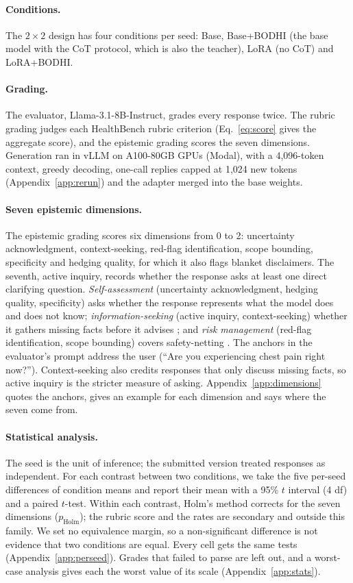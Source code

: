 \documentclass{article}
\newcommand{\bodhi}{BODHI}
\begin{document}
\paragraph{Conditions.} The $2 \times 2$ design has four conditions per seed: Base, Base+\bodhi{}
(the base model with the CoT protocol, which is also the teacher), LoRA (no CoT) and LoRA+\bodhi{}.

\paragraph{Grading.} The evaluator, Llama-3.1-8B-Instruct, grades every response twice. The rubric
grading judges each HealthBench rubric criterion (Eq.~\ref{eq:score} gives the aggregate score), and
the epistemic grading scores the seven dimensions. Generation ran in vLLM on A100-80GB GPUs
(Modal), with a 4,096-token context, greedy decoding, one-call replies capped at 1,024 new tokens
(Appendix~\ref{app:rerun}) and the adapter merged into the base weights.

\paragraph{Seven epistemic dimensions.} The epistemic grading scores six dimensions from 0 to 2:
uncertainty acknowledgment, context-seeking, red-flag identification, scope bounding, specificity
and hedging quality, for which it also flags blanket disclaimers. The seventh, active inquiry,
records whether the response asks at least one direct clarifying question. \emph{Self-assessment}
(uncertainty acknowledgment, hedging quality, specificity) asks whether the response represents
what the model does and does not know; \emph{information-seeking} (active inquiry,
context-seeking) whether it gathers missing facts before it advises \citep{simpkin2016tolerating};
and \emph{risk management} (red-flag identification, scope bounding) covers safety-netting
\citep{jones2019safety}. The anchors in the evaluator's prompt address the user (``Are you
experiencing chest pain right now?''). Context-seeking also credits responses that only discuss
missing facts, so active inquiry is the stricter measure of asking. Appendix~\ref{app:dimensions}
quotes the anchors, gives an example for each dimension and says where the seven come from.

\paragraph{Statistical analysis.} The seed is the unit of inference; the submitted version treated
responses as independent. For each contrast between two
conditions, we take the five per-seed differences of condition means and report their mean with a
95\% $t$ interval (4 df) and a paired $t$-test. Within each contrast, Holm's method
\citep{holm1979simple} corrects for the seven dimensions ($p_{\text{Holm}}$); the rubric score and
the rates are secondary and outside this family. We set no equivalence margin, so a non-significant
difference is not evidence that two conditions are equal. Every cell gets the same tests
(Appendix~\ref{app:perseed}). Grades that failed to parse are left out, and a worst-case analysis
gives each the worst value of its scale (Appendix~\ref{app:stats}).
\end{document}
